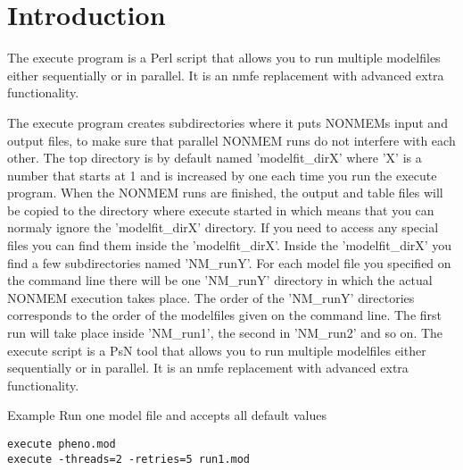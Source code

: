 




\maketitle
\newcommand{\guidetoolname}{execute}


\section{Introduction}
The execute program is a Perl script that allows you to run multiple
  modelfiles either sequentially or in parallel. It is an nmfe replacement
  with advanced extra functionality.

 The execute program creates subdirectories where it puts NONMEMs input and output files, to make sure that parallel 
 NONMEM runs do not interfere with each other. The top directory is by default named 'modelfit\_dirX' where 'X' is a 
 number that starts at 1 and is increased by one each time you run the execute program. When the NONMEM runs are 
 finished, the output and table files will be copied to the directory where execute started in which means that you can 
 normaly ignore the 'modelfit\_dirX' directory. If you need to access any special files you can find them inside the  
 'modelfit\_dirX'. Inside the 'modelfit\_dirX' you find a few subdirectories named 'NM\_runY'. For each model file you 
 specified on the command line there will be one 'NM\_runY' directory in which the actual NONMEM execution takes place. 
 The order of the 'NM_runY' directories corresponds to the order of the modelfiles given on the command line. The first run 
 will take place inside 'NM\_run1', the second in 'NM\_run2' and so on. The execute script is a PsN tool that allows you to run 
 multiple modelfiles either sequentially or in parallel. It is an nmfe replacement with advanced extra
functionality.

Example
Run one model file and accepts all default values

\begin{verbatim}
execute pheno.mod
execute -threads=2 -retries=5 run1.mod 
\end{verbatim}

